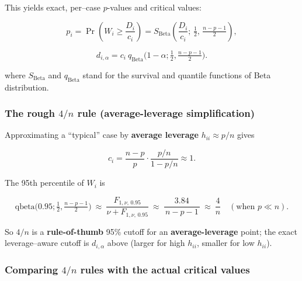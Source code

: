 \documentclass[
  letterpaper,
  DIV=11,
  numbers=noendperiod]{scrreprt}
\begin{document}
This yields exact, per--case \(p\)-values and critical values:

\[
p_i=\Pr\!\left(W_i\ge \frac{D_i}{c_i}\right)
= S_\mathrm{Beta}\!\left(\frac{D_i}{c_i};\,\tfrac12,\,\tfrac{n-p-1}{2}\right),
\]

\[
d_{i,\alpha}=c_i\ q_\mathrm{Beta}\!\Big(1-\alpha;\tfrac12,\tfrac{n-p-1}{2}\Big).
\]

where \(S_\mathrm{Beta}\) and \(q_\mathrm{Beta}\) stand for the survival
and quantile functions of Beta distribution.

\subsubsection{\texorpdfstring{The rough \(4/n\) rule (average-leverage
simplification)}{The rough 4/n rule (average-leverage simplification)}}\label{the-rough-4n-rule-average-leverage-simplification}

Approximating a ``typical'' case by \textbf{average leverage}
\(h_{ii}\approx p/n\) gives

\[
c_i=\frac{n-p}{p}\cdot\frac{p/n}{1-p/n}\approx 1 .
\]

The 95th percentile of \(W_i\) is

\[
\mathrm{qbeta}\!\Big(0.95;\tfrac12,\tfrac{n-p-1}{2}\Big)
\ \approx\ \frac{F_{1,\nu,\,0.95}}{\nu+F_{1,\nu,\,0.95}}
\ \approx\ \frac{3.84}{\,n-p-1\,}
\ \approx\ \frac{4}{n}\quad (\text{when }p\ll n).
\]

So \(4/n\) is a \textbf{rule-of-thumb} 95\% cutoff for an
\textbf{average-leverage} point; the exact leverage--aware cutoff is
\(d_{i,\alpha}\) above (larger for high \(h_{ii}\), smaller for low
\(h_{ii}\)).

\subsubsection{\texorpdfstring{Comparing \(4/n\) rules with the actual
critical
values}{Comparing 4/n rules with the actual critical values}}\label{comparing-4n-rules-with-the-actual-critical-values}
\end{document}
